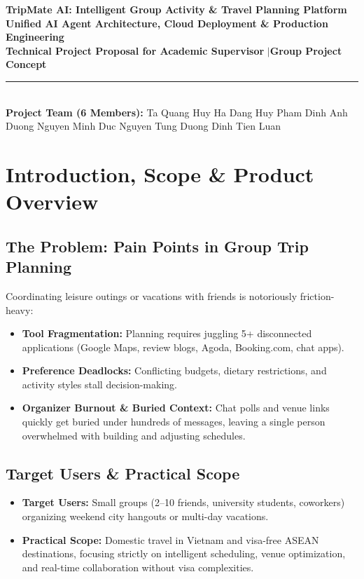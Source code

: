 \documentclass[11pt,a4paper]{article}
\begin{document}
\begin{center}
{\LARGE\bfseries\color{primaryblue} TripMate AI: Intelligent Group Activity \& Travel Planning Platform}\\[0.10cm]
{\large\bfseries\color{accentteal} Unified AI Agent Architecture, Cloud Deployment \& Production Engineering}\\[0.14cm]
{\small\textbf{Technical Project Proposal for Academic Supervisor} \quad$\vert$\quad \textbf{Group Project Concept}}\\[0.08cm]
\rule{\textwidth}{0.8pt}\\[0.08cm]
{\footnotesize \textbf{Project Team (6 Members):} Ta Quang Huy \quad Ha Dang Huy \quad Pham Dinh Anh Duong \quad Nguyen Minh Duc \quad Nguyen Tung Duong \quad Dinh Tien Luan}
\end{center}
\vspace{-0.15cm}

\section{Introduction, Scope \& Product Overview}

\subsection{The Problem: Pain Points in Group Trip Planning}
Coordinating leisure outings or vacations with friends is notoriously friction-heavy:
\begin{itemize}
\item \textbf{Tool Fragmentation:} Planning requires juggling 5+ disconnected applications (Google Maps, review blogs, Agoda, Booking.com, chat apps).
\item \textbf{Preference Deadlocks:} Conflicting budgets, dietary restrictions, and activity styles stall decision-making.
\item \textbf{Organizer Burnout \& Buried Context:} Chat polls and venue links quickly get buried under hundreds of messages, leaving a single person overwhelmed with building and adjusting schedules.
\end{itemize}

\subsection{Target Users \& Practical Scope}
\label{sec:target_audience}
\begin{itemize}
\item \textbf{Target Users:} Small groups (2--10 friends, university students, coworkers) organizing weekend city hangouts or multi-day vacations.
\item \textbf{Practical Scope:} Domestic travel in Vietnam and visa-free ASEAN destinations, focusing strictly on intelligent scheduling, venue optimization, and real-time collaboration without visa complexities.
\end{itemize}
\end{document}
